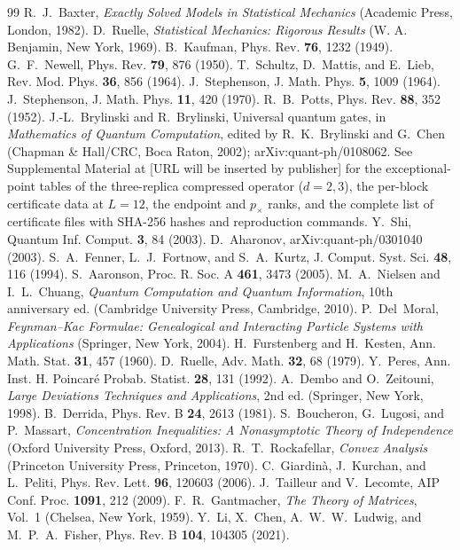 \documentclass[aps,prx,reprint,superscriptaddress,nobibnotes,longbibliography]{revtex4-2}
\theoremstyle{remark}
\begin{document}
\begin{thebibliography}{99}
 R.~J.~Baxter, \emph{Exactly Solved Models in Statistical Mechanics} (Academic Press, London, 1982).
 D.~Ruelle, \emph{Statistical Mechanics: Rigorous Results} (W. A. Benjamin, New York, 1969).
 B.~Kaufman, Phys. Rev. \textbf{76}, 1232 (1949).
 G.~F.~Newell, Phys. Rev. \textbf{79}, 876 (1950).
 T.~Schultz, D.~Mattis, and E.~Lieb, Rev. Mod. Phys. \textbf{36}, 856 (1964).
 J.~Stephenson, J. Math. Phys. \textbf{5}, 1009 (1964).
 J.~Stephenson, J. Math. Phys. \textbf{11}, 420 (1970).
 R.~B.~Potts, Phys. Rev. \textbf{88}, 352 (1952).
 J.-L.~Brylinski and R.~Brylinski, Universal quantum gates, in \emph{Mathematics of Quantum Computation}, edited by R.~K.~Brylinski and G.~Chen (Chapman \& Hall/CRC, Boca Raton, 2002); arXiv:quant-ph/0108062.
 See Supplemental Material at [URL will be inserted by publisher] for the exceptional-point tables of the three-replica compressed operator ($d=2,3$), the per-block certificate data at $L=12$, the endpoint and $p_\times$ ranks, and the complete list of certificate files with SHA-256 hashes and reproduction commands.
 Y.~Shi, Quantum Inf. Comput. \textbf{3}, 84 (2003).
 D.~Aharonov, arXiv:quant-ph/0301040 (2003).
 S.~A.~Fenner, L.~J.~Fortnow, and S.~A.~Kurtz, J. Comput. Syst. Sci. \textbf{48}, 116 (1994).
 S.~Aaronson, Proc. R. Soc. A \textbf{461}, 3473 (2005).
 M.~A.~Nielsen and I.~L.~Chuang, \emph{Quantum Computation and Quantum Information}, 10th anniversary ed. (Cambridge University Press, Cambridge, 2010).
 P.~Del~Moral, \emph{Feynman--Kac Formulae: Genealogical and Interacting Particle Systems with Applications} (Springer, New York, 2004).
 H.~Furstenberg and H.~Kesten, Ann. Math. Stat. \textbf{31}, 457 (1960).
 D.~Ruelle, Adv. Math. \textbf{32}, 68 (1979).
 Y.~Peres, Ann. Inst. H. Poincar\'e Probab. Statist. \textbf{28}, 131 (1992).
 A.~Dembo and O.~Zeitouni, \emph{Large Deviations Techniques and Applications}, 2nd ed. (Springer, New York, 1998).
 B.~Derrida, Phys. Rev. B \textbf{24}, 2613 (1981).
 S.~Boucheron, G.~Lugosi, and P.~Massart, \emph{Concentration Inequalities: A Nonasymptotic Theory of Independence} (Oxford University Press, Oxford, 2013).
 R.~T.~Rockafellar, \emph{Convex Analysis} (Princeton University Press, Princeton, 1970).
 C.~Giardin\`a, J.~Kurchan, and L.~Peliti, Phys. Rev. Lett. \textbf{96}, 120603 (2006).
 J.~Tailleur and V.~Lecomte, AIP Conf. Proc. \textbf{1091}, 212 (2009).
 F.~R.~Gantmacher, \emph{The Theory of Matrices}, Vol.~1 (Chelsea, New York, 1959).
 Y.~Li, X.~Chen, A.~W.~W.~Ludwig, and M.~P.~A.~Fisher, Phys. Rev. B \textbf{104}, 104305 (2021).
\end{thebibliography}
\end{document}
